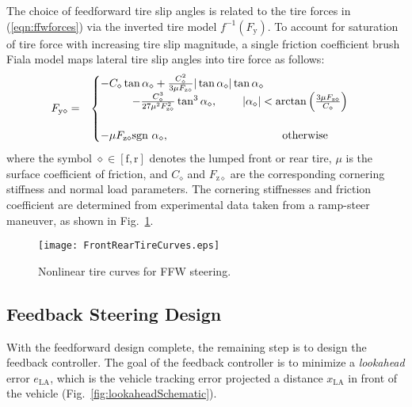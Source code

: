 The choice of feedforward tire slip angles is related to the tire forces in (\ref{eqn:ffwforces}) via the inverted tire model $f^{-1}(F_\mathrm{y})$. 
To account for saturation of tire force with increasing tire slip magnitude, a single friction coefficient brush Fiala model \cite{Pacejka2012} maps lateral 
tire slip angles into tire force as follows: 
\begin{eqnarray}
\label{eqn:fiala}
	F_\mathrm{y\diamond}&=&\begin{cases} -C_{\diamond}\tan\alpha_\diamond + \frac{C_\diamond^2}{3\mu F_\mathrm{z\diamond}} |\tan\alpha_\diamond| \tan\alpha_\diamond \\ \hspace{10mm}- \frac{C_\diamond^3}{27\mu^2F_\mathrm{z\diamond}^2}\tan^3\alpha_\diamond,
\hspace{8mm}  |\alpha_\diamond| < \arctan{\left(\frac{3\mu F_\mathrm{z\diamond}}{C_\diamond}\right)} \\ \\ -\mu F_\mathrm{z\diamond}\text{sgn} \ \alpha_\diamond, \hspace{36mm} \mathrm{otherwise} \end{cases}
\end{eqnarray}
where the symbol $\diamond \in [\mathrm{f},\mathrm{r}]$ denotes the lumped front or rear tire, $\mu$ is the surface coefficient of friction, and $C_\diamond$ and $F_\mathrm{z\diamond}$ are the corresponding cornering stiffness and normal
load parameters. The cornering stiffnesses and friction coefficient are determined from experimental data taken from a ramp-steer maneuver, as shown in Fig.~\ref{fig:tireCurve}.

\begin{figure}[h]
\centering
\texttt{[image: FrontRearTireCurves.eps]}
\caption{Nonlinear tire curves for FFW steering.}
\label{fig:tireCurve}
\end{figure}
\subsection{Feedback Steering Design}
\label{sec:lookahead}

With the feedforward design complete, the remaining step is to design the feedback controller. The goal of the feedback controller is to
minimize a \textit{lookahead} error $e_\mathrm{LA}$, which is the vehicle tracking error projected a distance 
$x_\mathrm{LA}$ in front of the vehicle (Fig.~\ref{fig:lookaheadSchematic}).

